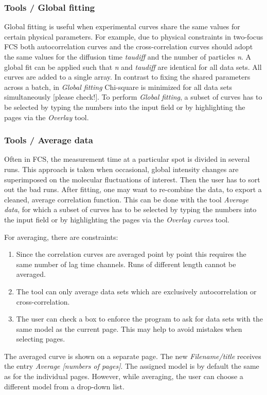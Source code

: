 \subsubsection{Tools / Global fitting}
\label{sec:menub.tools.globa}
Global fitting is useful when experimental curves share the same values for certain physical parameters. For example, due to physical constraints in two-focus FCS both autocorrelation curves and the cross-correlation curves should adopt the same values for the diffusion time \textit{taudiff} and the number of particles \textit{n}. A global fit can be applied such that \textit{n} and \textit{taudiff} are identical for all data sets. All curves are added to a single array. In contrast to fixing the shared parameters across a batch, in \textit{Global fitting} Chi-square is minimized for all data sets simultaneously [please check!]. To perform \textit{Global fitting}, a subset of curves has to be selected by typing the numbers into the input field or by highlighting the pages via the \textit{Overlay} tool. 

\subsubsection{Tools / Average data}
\label{sec:menub.tools.avera}
Often in FCS, the measurement time at a particular spot is divided in several runs. This approach is taken when occasional, global intensity changes are superimposed on the molecular fluctuations of interest. Then the user has to sort out the bad runs. After fitting, one may want to re-combine the data, to export a cleaned, average correlation function. This can be done with the tool \textit{Average data}, for which a subset of curves has to be selected by typing the numbers into the input field or by highlighting the pages via the \textit{Overlay curves} tool. 

For averaging, there are constraints:


\begin{enumerate}
\item Since the correlation curves are averaged point by point this requires the same number of lag time channels. Runs of different length cannot be averaged.
\item The tool can only average data sets which are exclusively autocorrelation or cross-correlation.
\item The user can check a box to enforce the program to ask for data sets with the same model as the current page. This may help to avoid mistakes when selecting pages.
\end{enumerate}
The averaged curve is shown on a separate page. The new \textit{Filename/title} receives the entry \textit{Average [numbers of pages]}. The assigned model is by default the same as for the individual pages. However, while averaging, the user can choose a different model from a drop-down list. 

